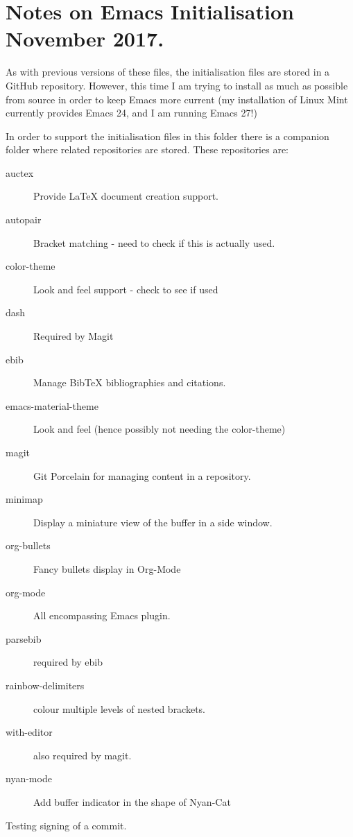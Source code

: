 \documentclass[a4paper]{article}
\begin{document}
\section{Notes on Emacs Initialisation November 2017.}
\label{sec:notes-emacs-init}

As with previous versions of these files, the initialisation files are
stored in a GitHub repository.  However, this time I am trying to
install as much as possible from source in order to keep Emacs more
current (my installation of Linux Mint currently provides Emacs 24,
and I am running Emacs 27!)

In order to support the initialisation files in this folder there is a
companion folder where related repositories are stored. These
repositories are:

\begin{description}
\item[auctex] Provide \LaTeX{} document creation support.
\item[autopair] Bracket matching - need to check if this is actually used.
\item[color-theme] Look and feel support - check to see if used
\item[dash] Required by Magit
\item[ebib] Manage BibTeX bibliographies and citations.
\item[emacs-material-theme] Look and feel (hence possibly not needing
  the color-theme)
\item[magit] Git Porcelain for managing content in a repository.
\item[minimap] Display a miniature view of the buffer in a side window.
\item[org-bullets] Fancy bullets display in Org-Mode
\item[org-mode] All encompassing Emacs plugin.
\item[parsebib] required by ebib
\item[rainbow-delimiters] colour multiple levels of nested brackets.
\item[with-editor] also required by magit.
\item[nyan-mode] Add buffer indicator in the shape of Nyan-Cat
\end{description}

Testing signing of a commit.
\end{document}
